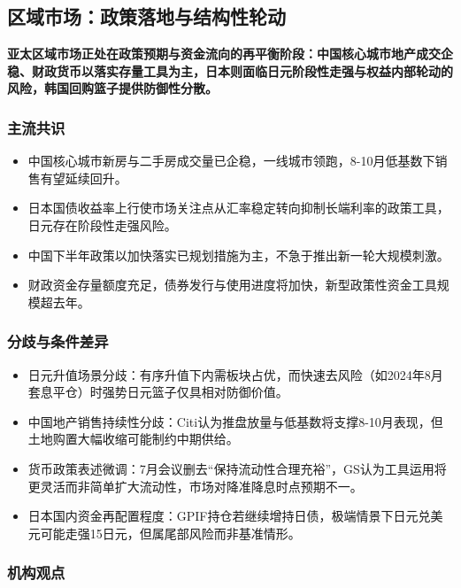 \documentclass[11pt]{ctexart}
\begin{document}
\subsection{区域市场：政策落地与结构性轮动}
\textbf{亚太区域市场正处在政策预期与资金流向的再平衡阶段：中国核心城市地产成交企稳、财政货币以落实存量工具为主，日本则面临日元阶段性走强与权益内部轮动的风险，韩国回购篮子提供防御性分散。}
\subsubsection*{主流共识}
\begin{itemize}
  \item 中国核心城市新房与二手房成交量已企稳，一线城市领跑，8-10月低基数下销售有望延续回升。
  \item 日本国债收益率上行使市场关注点从汇率稳定转向抑制长端利率的政策工具，日元存在阶段性走强风险。
  \item 中国下半年政策以加快落实已规划措施为主，不急于推出新一轮大规模刺激。
  \item 财政资金存量额度充足，债券发行与使用进度将加快，新型政策性资金工具规模超去年。
\end{itemize}
\subsubsection*{分歧与条件差异}
\begin{itemize}
  \item 日元升值场景分歧：有序升值下内需板块占优，而快速去风险（如2024年8月套息平仓）时强势日元篮子仅具相对防御价值。
  \item 中国地产销售持续性分歧：Citi认为推盘放量与低基数将支撑8-10月表现，但土地购置大幅收缩可能制约中期供给。
  \item 货币政策表述微调：7月会议删去“保持流动性合理充裕”，GS认为工具运用将更灵活而非简单扩大流动性，市场对降准降息时点预期不一。
  \item 日本国内资金再配置程度：GPIF持仓若继续增持日债，极端情景下日元兑美元可能走强15日元，但属尾部风险而非基准情形。
\end{itemize}
\subsubsection*{机构观点}
\end{document}
